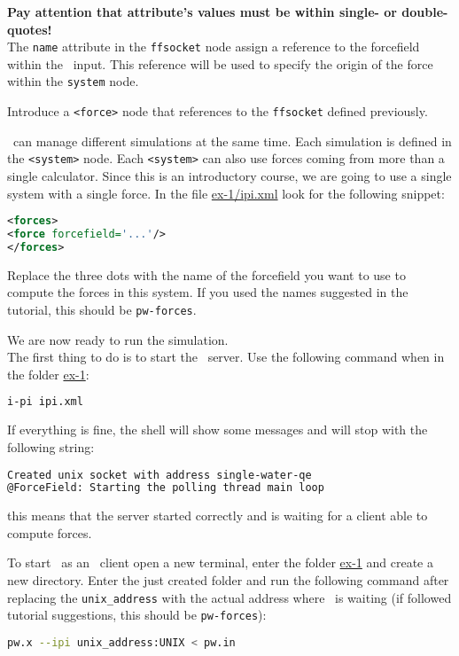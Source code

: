 \documentclass{article}
\begin{document}
\begin{Exercise}[label={i-pi},title={Molecular Dynamics: a client/server approach}]
\textbf{Pay attention that attribute's values must be within single- or
double-quotes!}\\


The \texttt{name} attribute in the \texttt{ffsocket} node assign a
reference to the forcefield within the \ipi\ input. This reference
will be used to specify the origin of the force within the
\texttt{system} node.

\Question
Introduce a \texttt{<force>} node that references to the
\texttt{ffsocket} defined previously.

\ipi\ can manage different simulations at the same time. Each
simulation is defined in the \texttt{<system>} node. Each
\texttt{<system>} can also use forces coming from more than a single
calculator. Since this is an introductory course, we are going to use
a single system with a single force. In the file \url{ex-1/ipi.xml}
look for the following snippet:
\begin{lstlisting}[language=xml]
<forces>
<force forcefield='...'/>
</forces>
\end{lstlisting}
Replace the three dots with the name of the forcefield you want to use
to compute the forces in this system. If you used the names suggested
in the tutorial, this should be \texttt{pw-forces}.

\Question
We are now ready to run the simulation.\\

The first thing to do is to start the \ipi\ server. Use the following
command when in the folder \url{ex-1}:
\begin{lstlisting}[language=bash]
i-pi ipi.xml
\end{lstlisting}
If everything is fine, the shell will show some messages and will stop
with the following string:
\begin{lstlisting}[language=bash]
Created unix socket with address single-water-qe
@ForceField: Starting the polling thread main loop
\end{lstlisting}
this means that the server started correctly and is waiting for a
client able to compute forces.

To start \pwx\ as an \ipi\ client open a new terminal, enter the
folder \url{ex-1} and create a new directory. Enter the just
created folder and run the
following command after replacing the \texttt{unix\_address} with the
actual address where \ipi\ is waiting (if followed tutorial
suggestions, this should be \texttt{pw-forces}):
\begin{lstlisting}[language=bash]
pw.x --ipi unix_address:UNIX < pw.in 
\end{lstlisting}



\end{Exercise}
\end{document}
